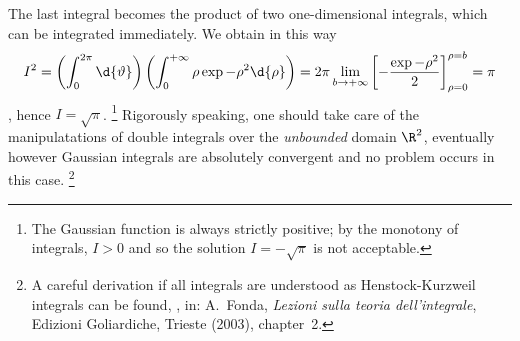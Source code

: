 The last integral becomes the product of two one-dimensional
integrals, which can be integrated immediately. We obtain in this way 
\begin{dmath*}[compact]
I^{2} = \left( \int_{0}^{2\pi} \d{\vartheta} \right) \left(
\int_{0}^{+\infty} \rho \exp{-\rho^{2}} \d{\rho} \right) = 2\pi
\lim_{b\rightarrow+\infty} \left[
-\frac{\exp{-\rho^{2}}}{2} \right]_{\rho = 0}^{\rho = b} = \pi 
\end{dmath*},
hence $I = \sqrt{\pi}$.%
\footnote{The Gaussian function is always strictly positive; by the monotony of
   integrals, $I>0$ and so the solution
   $I=-\sqrt{\pi}$ is not acceptable.}
Rigorously speaking, one should take care of the
manipulatations of double integrals over the \emph{unbounded} domain $\R^{2}$, 
eventually 
however Gaussian integrals are absolutely convergent and 
no
problem occurs in this case.%
\footnote{A careful derivation if all integrals are understood as Henstock-Kurzweil
integrals can be found, \eg, in: A.~Fonda,
\emph{Lezioni sulla teoria dell'integrale}, Edizioni Goliardiche, Trieste
(2003), chapter~2.}


